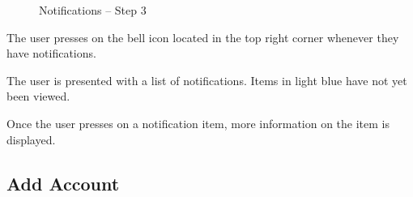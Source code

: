 \begin{figure}
\begin{minipage}{4.6cm}
    \caption{Notifications -- Step 3}
    \label{fig:ui_not_step3}
  \end{minipage}
\end{figure}

\begin{minipage}{\textwidth}
  \centering
  \begin{minipage}[t]{4.6cm}
    \vspace{0pt}
    \centering
    \begin{minipage}{4.4cm}
      The user presses on the bell icon located in the top right corner whenever they have notifications.
    \end{minipage}
  \end{minipage}
  \begin{minipage}[t]{4.6cm}
    \vspace{0pt}
    \centering
    \begin{minipage}{4.4cm}
      The user is presented with a list of notifications. Items in light blue have not yet been viewed.
    \end{minipage}
  \end{minipage}
  \begin{minipage}[t]{4.6cm}
    \vspace{0pt}
    \centering
    \begin{minipage}{4.4cm}
      Once the user presses on a notification item, more information on the item is displayed.
    \end{minipage}
  \end{minipage}
\end{minipage}

\clearpage

\subsection{Add Account}


